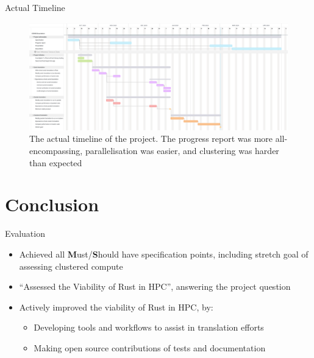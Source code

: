 \documentclass[10pt,aspectratio=169]{beamer}
\begin{document}
\begin{frame}{Actual Timeline}
    \begin{figure}[h]
        \centering
        \includegraphics[width=\textwidth]{images/actual_gantt_chart.png}
        \caption{The actual timeline of the project. The progress report was more all-encompassing, parallelisation was easier, and clustering was harder than expected}
        \label{fig:actual_gantt_chart}
    \end{figure}
\end{frame}



\section{Conclusion}

\begin{frame}{Evaluation}
    \begin{itemize}
        \item Achieved all \textbf{M}ust/\textbf{S}hould have specification points, including stretch goal of assessing clustered compute
        \item ``Assessed the Viability of Rust in HPC'', answering the project question
        \vspace{0.5cm}
        \item<2-> \alert{Actively improved} the viability of Rust in HPC, by:
        \begin{itemize}
            \item Developing tools and workflows to assist in translation efforts
            \item Making open source contributions of tests and documentation
        \end{itemize}
    \end{itemize}
\end{frame}
\end{document}
